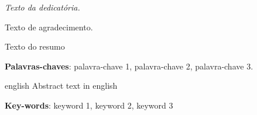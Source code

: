 \documentclass[
	12pt,				%
	openright,			%
	oneside,			%
	a4paper,			%
	english,			%
	brazil				%
	]{abntex2}
\begin{document}
\frenchspacing

\imprimircapa

\imprimirfolhaderosto

 \begin{dedicatoria}
   \vspace*{\fill}
   \centering
   \noindent
   \textit{ Texto da dedicatória.} \vspace*{\fill}
 \end{dedicatoria}

 \begin{agradecimentos}
 Texto de agradecimento.

 \end{agradecimentos}

 \begin{epigrafe}
     \vspace*{\fill}
 	\begin{flushright}
 		\textit{}
 	\end{flushright}
 \end{epigrafe}

\setlength{\absparsep}{18pt} %
\begin{resumo}

Texto do resumo

\textbf{Palavras-chaves}: palavra-chave 1, palavra-chave 2, palavra-chave 3.
\end{resumo}

\begin{resumo}[Abstract]
 \begin{otherlanguage*}{english}
    Abstract text in english
   
   \textbf{Key-words}: keyword 1, keyword 2, keyword 3
 \end{otherlanguage*}
\end{resumo}
\end{document}
